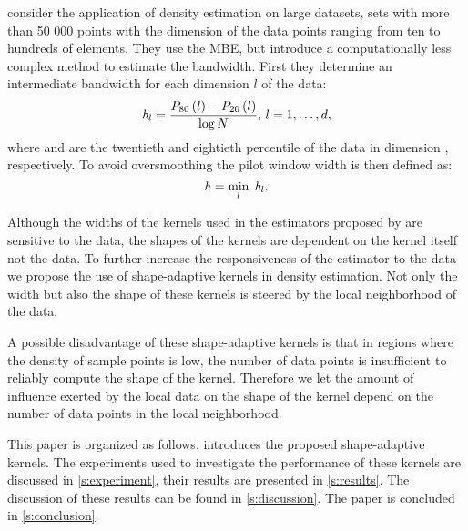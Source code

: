 	\textcite{ferdosi2011comparison} consider the application of density estimation on large datasets, \ie sets with more than 50 000 points with the dimension of the data points ranging from ten to hundreds of elements. They use the MBE, but introduce a computationally less complex method to estimate the bandwidth. First they determine an intermediate bandwidth for each dimension $l$ of the data:
		\begin{equation}\label{eq:1:ferdosiGeneralBandwidth}
			\mathit{h}_{l} = \frac{P_{80}\left( l \right) - P_{20}\left( l \right)}{\log N}, \, l = 1, \dotsc, d,
		\end{equation}
	where  and  are the twentieth and eightieth percentile of the data in dimension \itDim, respectively. 
	To avoid oversmoothing the pilot window width is then defined as:
	\begin{equation*}
	 	\mathit{h} = \min_{l} \; \mathit{h}_{l}.
	 \end{equation*}

	Although the widths of the kernels used in the estimators proposed by \citeauthor{breiman1977variable,wilkinson1995dataplot} are sensitive to the data, the shapes of the kernels are dependent on the kernel itself not the data. To further increase the responsiveness of the estimator to the data we propose the use of shape-adaptive kernels in density estimation. Not only the width but also the shape of these kernels is steered by the local neighborhood of the data.

	A possible disadvantage of these shape-adaptive kernels is that in regions where the density of sample points is low, the number of data points is insufficient to reliably compute the shape of the kernel. Therefore we let the amount of influence exerted by the local data on the shape of the kernel depend on the number of data points in the local neighborhood.

	This paper is organized as follows.  introduces the proposed shape-adaptive kernels. The experiments used to investigate the performance of these kernels are discussed in \cref{s:experiment}, their results are presented in \cref{s:results}. The discussion of these results can be found in \cref{s:discussion}. The paper is concluded in \cref{s:conclusion}.